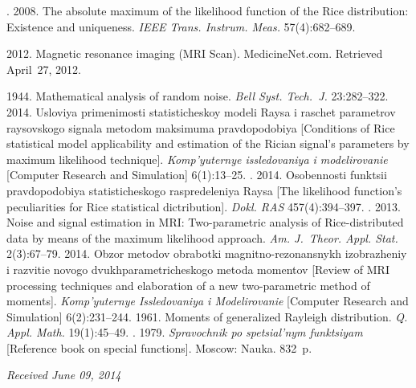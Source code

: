 \begin{multicols}{2}
{{\begin{thebibliography}{99}
. 2008.
The absolute maximum of the likelihood function
of the Rice distribution: Existence and uniqueness. \textit{IEEE Trans. Instrum.
Meas.} 57(4):682--689.

 2012. Magnetic resonance imaging (MRI Scan). MedicineNet.com.
Retrieved April~27, 2012.

 1944. Mathematical analysis of random noise. \textit{Bell Syst. Tech.~J.}
23:282--322.
 2014. Usloviya primenimosti sta\-ti\-sti\-che\-skoy modeli
Raysa i raschet parametrov raysovskogo signala metodom maksimuma
pravdopodobiya [Conditions of
Rice statistical model applicability and estimation of the Rician signal's
parameters by maximum likelihood technique].
\textit{Komp'yuternye issledovaniya i modelirovanie}  [Computer
Research and Simulation] 6(1):13--25.
.
2014. Oso\-ben\-no\-sti funktsii pravdopodobiya
statisticheskogo raspredeleniya Raysa [The likelihood function's peculiarities for Rice
statistical dictribution]. \textit{Dokl. RAS} 457(4):394--397.
. 2013.
Noise and signal estimation in MRI: Two-parametric
analysis of Rice-distributed data by means of the maximum likelihood
approach. \textit{Am. J.~Theor. Appl. Stat.} 2(3):67--79.
 2014. Obzor metodov obrabotki magnitno-rezonansnykh
izobrazheniy i razvitie novogo dvukhparametricheskogo metoda momentov
[Review of MRI processing techniques and elaboration of a new two-parametric
method of moments]. \textit{Komp'yuternye
Issledovaniya i Modelirovanie} [Computer Research and Simulation] 6(2):231--244.
 1961. Moments of generalized Rayleigh distribution.
\textit{Q. Appl. Math.} 19(1):45--49.
. 1979. \textit{Spravochnik
po spe\-tsi\-al'\-nym funktsiyam} [Reference book on special functions]. Moscow: Nauka.
832~p.
\end{thebibliography}

 }
 }

\end{multicols}

\vspace*{-6pt}

\hfill{\small\textit{Received June 09, 2014}}

\vspace*{-18pt}

